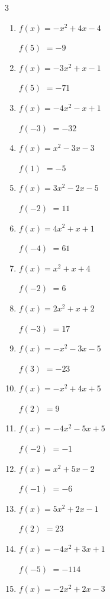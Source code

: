 \begin{multicols}{3}
\begin{enumerate}
$f(-5)$
        $= 27$

\columnbreak %

  \item $f(x)=-x^{2}+4x-4$

$f(5)$
        $= -9$

  \item $f(x)=-3x^{2}+x-1$

$f(5)$
        $= -71$

  \item $f(x)=-4x^{2}-x+1$

$f(-3)$
        $= -32$

  \item $f(x)=x^{2}-3x-3$

$f(1)$
        $= -5$

  \item $f(x)=3x^{2}-2x-5$

$f(-2)$
        $= 11$

  \item $f(x)=4x^{2}+x+1$

$f(-4)$
        $= 61$

  \item $f(x)=x^{2}+x+4$

$f(-2)$
        $= 6$

  \item $f(x)=2x^{2}+x+2$

$f(-3)$
        $= 17$

  \item $f(x)=-x^{2}-3x-5$

$f(3)$
        $= -23$

  \item $f(x)=-x^{2}+4x+5$

$f(2)$
        $= 9$

  \item $f(x)=-4x^{2}-5x+5$

$f(-2)$
        $= -1$

  \item $f(x)=x^{2}+5x-2$

$f(-1)$
        $= -6$

  \item $f(x)=5x^{2}+2x-1$

$f(2)$
        $= 23$

  \item $f(x)=-4x^{2}+3x+1$

$f(-5)$
        $= -114$

  \item $f(x)=-2x^{2}+2x-3$


\end{enumerate}
\end{multicols}
